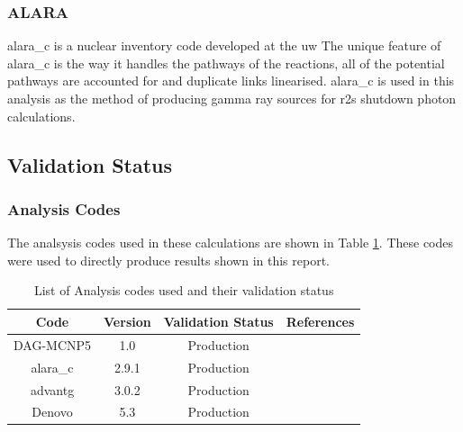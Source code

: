 \documentclass[12pt]{article}
\begin{document}
\subsubsection{ALARA}
\gls{alara_c} \cite{alara} is a nuclear inventory code developed at the \gls{uw}
The unique feature of \gls{alara_c} is the way it handles the
pathways of the reactions, all of the potential pathways are accounted for and
duplicate links linearised. \gls{alara_c} is used in this analysis as the method
of producing gamma ray sources for \gls{r2s} shutdown photon calculations.

\subsection{Validation Status}
\subsubsection*{Analysis Codes}
The analsysis codes used in these calculations are shown in Table 
\ref{table:validation}. These codes were used to directly produce results shown
in this report.
\begin{centering}
 \begin{table}[ht!]
  \begin{tabular}{c | c | c | c}
  \hline
  Code & Version & Validation Status & References \\
  \hline 
  DAG-MCNP5 & 1.0 & Production & \cite{dagmc_validation}\\
  \gls{alara_c} & 2.9.1 & Production & \cite{alara}\\
  \gls{advantg} & 3.0.2 & Production & \cite{advantg}\\
  Denovo & 5.3 & Production & \cite{denovo} \\
  \end{tabular}
 \caption{List of Analysis codes used and their validation status}
 \label{table:validation}
 \end{table}
\end{centering}
\end{document}
